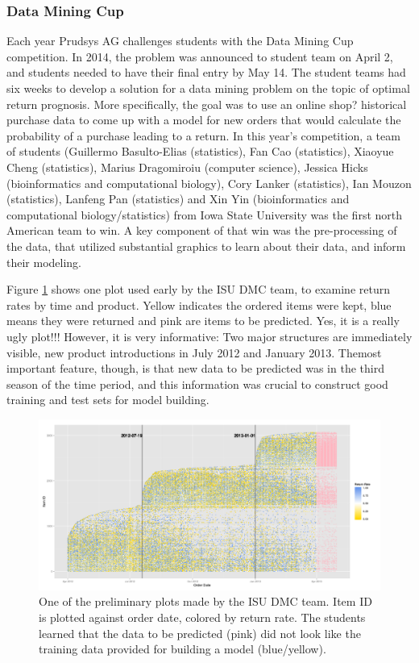 \documentclass{article}
\begin{document}
\subsubsection{Data Mining Cup}

Each year Prudsys AG  challenges students with  the Data Mining Cup competition. In 2014, the problem was announced to student team on April 2, and students needed to have their final entry by May 14. The student teams had six weeks to develop a solution for a data mining problem on the topic of optimal return prognosis. More specifically, the goal was to use an online shop? historical purchase data to come up with a model for new orders that would calculate the probability of a purchase leading to a return. In this year's competition, a team of students (Guillermo Basulto-Elias (statistics), Fan Cao (statistics), Xiaoyue Cheng (statistics), Marius Dragomiroiu (computer science), Jessica Hicks (bioinformatics and computational biology), Cory Lanker (statistics), Ian Mouzon (statistics), Lanfeng Pan (statistics) and Xin Yin (bioinformatics and computational biology/statistics) from Iowa State University was the first north American team to win. A key component of that win was the pre-processing of the data, that utilized substantial graphics to learn about their data, and inform their modeling.

Figure \ref{DMC1} shows one plot used early by the ISU DMC team, to examine return rates by time and product. Yellow indicates the ordered items were kept, blue means they were returned and pink are items to be predicted. Yes, it is a really ugly plot!!! However, it is very informative: Two major structures are immediately visible, new product introductions in July 2012 and January 2013. Themost important feature, though, is that new data to be predicted was in the third season of the time period, and this information was crucial to construct good training and test sets for model building.

\begin{figure}[htp]
\centerline{\includegraphics[width=7in]{images/orderDate_itemID.png}}
\caption{One of the preliminary plots made by the ISU DMC team. Item ID is plotted against order date, colored by return rate. The students learned that the data to be predicted (pink) did not look like the training data provided for building a model (blue/yellow).}
\label{DMC1}
\end{figure}
\end{document}
